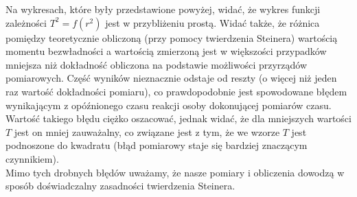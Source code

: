 \documentclass[10pt,a4paper]{article}
\newcommand{\forceindent}{\leavevmode{\parindent=3em\indent}}
\begin{document}
\forceindent Na wykresach, które były przedstawione powyżej, widać, że wykres funkcji zależności $T^2 = f(r^2)$ jest w przybliżeniu prostą.
Widać także, że różnica pomiędzy teoretycznie obliczoną (przy pomocy twierdzenia Steinera) wartością momentu bezwładności a wartością zmierzoną jest w większości przypadków mniejsza niż dokładność obliczona na podstawie możliwości przyrządów pomiarowych. Część wyników nieznacznie odstaje od reszty (o więcej niż jeden raz wartość dokładności pomiaru), co prawdopodobnie jest spowodowane błędem wynikającym z opóźnionego czasu reakcji osoby dokonującej pomiarów czasu. Wartość takiego błędu ciężko oszacować, jednak widać, że dla mniejszych wartości $T$ jest on mniej zauważalny, co związane jest z tym, że we wzorze $T$ jest podnoszone do kwadratu (błąd pomiarowy staje się bardziej znaczącym czynnikiem).\\
Mimo tych drobnych błędów uważamy, że nasze pomiary i obliczenia dowodzą w sposób doświadczalny zasadności twierdzenia Steinera.
\end{document}
